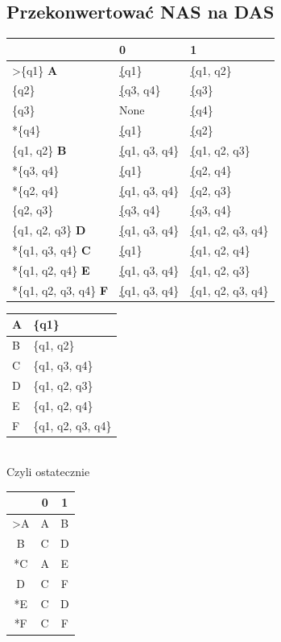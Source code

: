 \documentclass[a4paper,11pt]{article}
\begin{document}
\subsection{Przekonwertować NAS na DAS}
\begin{center}
	\begin{tabular}{|l|l|l|}
		\hline
		                               & 0                    & 1                        \\ \hline
		>\{q1\} \textbf{A}             & {\ul \{q1\}}         & {\ul \{q1, q2\}}         \\ \hline
		\{q2\}                         & {\ul \{q3, q4\}}     & {\ul \{q3\}}             \\ \hline
		\{q3\}                         & None                 & {\ul \{q4\}}             \\ \hline
		*\{q4\}                        & {\ul \{q1\}}         & {\ul \{q2\}}             \\ \hline
		\{q1, q2\} \textbf{B}          & {\ul \{q1, q3, q4\}} & {\ul \{q1, q2, q3\}}     \\ \hline
		*\{q3, q4\}                    & {\ul \{q1\}}         & {\ul \{q2, q4\}}         \\ \hline
		*\{q2, q4\}                    & {\ul \{q1, q3, q4\}} & {\ul \{q2, q3\}}         \\ \hline
		\{q2, q3\}                     & {\ul \{q3, q4\}}     & {\ul \{q3, q4\}}         \\ \hline
		\{q1, q2, q3\} \textbf{D}      & {\ul \{q1, q3, q4\}} & {\ul \{q1, q2, q3, q4\}} \\ \hline
		*\{q1, q3, q4\} \textbf{C}     & {\ul \{q1\}}         & {\ul \{q1, q2, q4\}}     \\ \hline
		*\{q1, q2, q4\} \textbf{E}     & {\ul \{q1, q3, q4\}} & {\ul \{q1, q2, q3\}}     \\ \hline
		*\{q1, q2, q3, q4\} \textbf{F} & {\ul \{q1, q3, q4\}} & {\ul \{q1, q2, q3, q4\}} \\ \hline
	\end{tabular}
	\hspace{1cm}
	\begin{tabular}{|l|l|}
		\hline
		A & \{q1\}             \\ \hline
		B & \{q1, q2\}         \\ \hline
		C & \{q1, q3, q4\}     \\ \hline
		D & \{q1, q2, q3\}     \\ \hline
		E & \{q1, q2, q4\}     \\ \hline
		F & \{q1, q2, q3, q4\} \\ \hline
	\end{tabular}
	\\
	\vspace{1cm}
	Czyli ostatecznie

	\begin{tabular}{|c|c|c|}
		\hline
		   & 0 & 1 \\ \hline
		>A & A & B \\ \hline
		B  & C & D \\ \hline
		*C & A & E \\ \hline
		D  & C & F \\ \hline
		*E & C & D \\ \hline
		*F & C & F \\ \hline
	\end{tabular}
\end{center}
\end{document}
